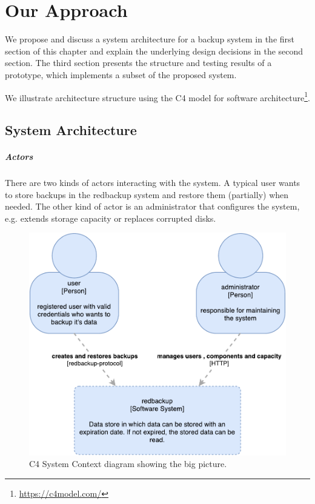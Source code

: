 \chapter{Our Approach}
\label{sec:our-approach}

We propose and discuss a system architecture for a backup system in the first section of this chapter and explain the underlying design decisions in the second section. The third section presents the structure and testing results of a prototype, which implements a subset of the proposed system.

We illustrate architecture structure using the C4 model for software architecture\footnote{\url{https://c4model.com/}}.

\section{System Architecture}

\paragraph{Actors} There are two kinds of actors interacting with the system. A typical \gls{user} wants to store backups in the redbackup system and restore them (partially) when needed. The other kind of actor is an \gls{administrator} that configures the system, e.g. extends storage capacity or replaces corrupted disks.

\begin{figure}[h]
	\centering
	\includegraphics[width=0.8\linewidth]{resources/c4-overview}
	\caption[C4 System Context diagram]{C4 System Context diagram showing the big picture.}
	\label{fig:c4-overview}
\end{figure}

